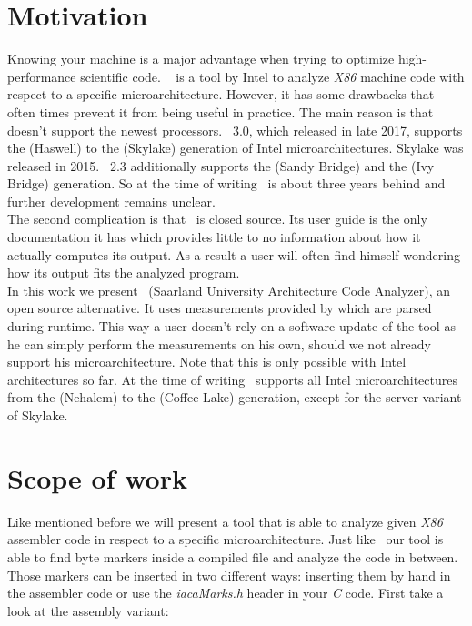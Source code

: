 
\section{Motivation}

Knowing your machine is a major advantage when trying to optimize high-performance scientific code. \iaca\ \cite{iaca} is a tool by Intel to analyze \emph{X86} machine code with respect to a specific microarchitecture. However, it has some drawbacks that often times prevent it from being useful in practice. The main reason is that doesn't support the newest processors. \iaca\ $3.0$, which released in late 2017, supports the  (Haswell) to the  (Skylake) generation of Intel microarchitectures. Skylake was released in 2015. \iaca\ $2.3$ additionally supports the  (Sandy Bridge) and the  (Ivy Bridge) generation. So at the time of writing \iaca\ is about three years behind and further development remains unclear.\\
The second complication is that \iaca\ is closed source. Its user guide \cite{userguide} is the only documentation it has which provides little to no information about how it actually computes its output. As a result a user will often find himself wondering how its output fits the analyzed program.\\
In this work we present \suaca\ (Saarland University Architecture Code Analyzer), an open source alternative. It uses measurements provided by \cite{Andreas} which are parsed during runtime. This way a user doesn't rely on a software update of the tool as he can simply perform the measurements on his own, should we not already support his microarchitecture. Note that this is only possible with Intel architectures so far. At the time of writing \suaca\ supports all Intel microarchitectures from the  (Nehalem) to the  (Coffee Lake) generation, except for the server variant of Skylake.

\newpage
\section{Scope of work}

Like mentioned before we will present a tool that is able to analyze given \emph{X86} assembler code in respect to a specific microarchitecture. Just like \iaca\ our tool is able to find byte markers inside a compiled file and analyze the code in between. Those markers can be inserted in two different ways: inserting them by hand in the assembler code or use the \emph{iacaMarks.h} header in your \emph{C} code. First take a look at the assembly variant:

